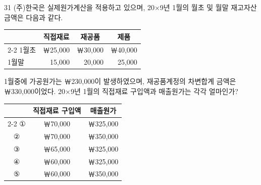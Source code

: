 \begin{question}{31}
(주)한국은 실제원가계산을 적용하고 있으며, 20×9년 1월의 월초 및 월말 재고자산 금액은 다음과 같다.

{\small\centering
\begin{tabular}{@{}l r r r@{}}
\hline
 & \multicolumn{1}{c}{직접재료} & \multicolumn{1}{c}{재공품} & \multicolumn{1}{c}{제품} \\
\cline{2-2}\cline{3-3}\cline{4-4}
1월초 & ￦25,000 & ￦30,000 & ￦40,000 \\
1월말 & 15,000 & 20,000 & 25,000 \\
\hline
\end{tabular}\par}
1월중에 가공원가는 ￦230,000이 발생하였으며, 재공품계정의 차변합계 금액은 ￦330,000이었다. 20×9년 1월의 직접재료 구입액과 매출원가는 각각 얼마인가? \par

{\small\centering
\begin{tabular}{@{}ccc@{}}
 & 직접재료 구입액 & 매출원가 \\
\cline{2-2}\cline{3-3}
① & ￦70,000 & ￦325,000 \\
② & ￦70,000 & ￦350,000 \\
③ & ￦65,000 & ￦325,000 \\
④ & ￦60,000 & ￦325,000 \\
⑤ & ￦60,000 & ￦350,000 \\
\end{tabular}\par}
\end{question}
